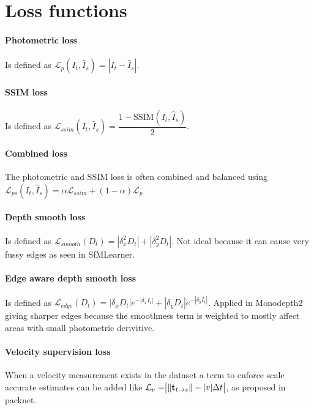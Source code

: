 \section{Loss functions}
\label{sec:loss}

\paragraph{Photometric loss} Is defined as $ \mathcal{L}_p(I_t, \hat{I}_s)=|I_t - \hat{I}_s| $.

\paragraph{SSIM loss} Is defined as $ \mathcal{L}_{ssim}(I_t, \hat{I}_s)=\dfrac{1-\textrm{SSIM}(I_t, \hat{I}_s)}{2} $.

\paragraph{Combined loss} The photometric and SSIM loss is often combined and balanced using $ \mathcal{L}_{ps}(I_t, \hat{I}_s) = \alpha \mathcal{L}_{ssim} + (1-\alpha) \mathcal{L}_p $

\paragraph{Depth smooth loss} Is defined as $ \mathcal{L}_{smooth}(D_t)=|\delta_x^2 D_t|+|\delta_y^2 D_t| $. Not ideal because it can cause very fussy edges as seen in SfMLearner.

\paragraph{Edge aware depth smooth loss} Is defined as $ \mathcal{L}_{edge}(D_t)=|\delta_x D_t|e^{-|\delta_x I_t|} + |\delta_y D_t|e^{-|\delta_y I_t|} $. Applied in Monodepth2 giving sharper edges because the smoothness term is weighted to mostly affect areas with small photometric derivitive.

\paragraph{Velocity supervision loss} When a velocity measurement exists in the dataset a term to enforce scale accurate estimates can be added like $ \mathcal{L}_{v} = \bigr{|} \| \textbf{t}_{t \rightarrow s} \| - |v|\Delta t \bigr{|} $, as proposed in packnet\cite{packnet}.

